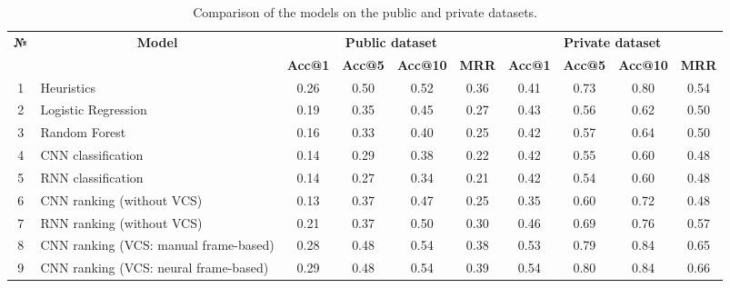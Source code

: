 
\begin{table*}
    \centering
    \caption{Comparison of the models on the public and private datasets.}
    \begin{tabular}{clcccccccc} 
        \toprule
        \multicolumn{1}{c}{\multirow{2}{*}{\textbf{№}}} & \multicolumn{1}{c}{\multirow{2}{*}{\textbf{Model}}} & \multicolumn{4}{c}{\textbf{Public dataset}} & \multicolumn{4}{c}{\textbf{Private dataset}} \\ 
        \cmidrule(lr){3-6}\cmidrule(lr){7-10}
        && \textbf{Acc@1} 
        & \textbf{Acc@5} & \textbf{Acc@10} & \textbf{MRR} & \textbf{Acc@1} 
        & \textbf{Acc@5} & \textbf{Acc@10} & \textbf{MRR} \\ 
        \midrule
        1 &Heuristics & 0.26 
        & 0.50	& 0.52 & 0.36 & 0.41 
        & 0.73 & 0.80 & 0.54 \\ 
        
        2 & Logistic Regression & 0.19 
        & 0.35 & 0.45 & 0.27 & 0.43 
        & 0.56 & 0.62 & 0.50 \\ 
        
        3 & Random Forest & 0.16 
        & 0.33 & 0.40 & 0.25 & 0.42 
        & 0.57 & 0.64 & 0.50 \\ 
        
        4 & CNN classification & 0.14 
        & 0.29 & 0.38 & 0.22	 & 0.42 
        & 0.55 & 0.60 & 0.48 \\ 
        
        5 & RNN classification & 0.14 
        & 0.27	& 0.34 & 0.21	& 0.42  
        & 0.54 & 0.60 & 0.48 \\ 
        
        6 & CNN ranking (without VCS) & 0.13
        & 0.37 &	0.47 & 0.25 & 0.35 
        & 0.60 & 0.72 & 0.48 \\ 
        
        7 & RNN ranking (without VCS) & 0.21 
        & 0.37 &	0.50 & 0.30 & 0.46 
        & 0.69 & 0.76 & 0.57 \\ 
        \midrule
        8 &CNN ranking (VCS: manual frame-based) & 0.28	
        & 0.48 & 0.54 & 0.38 & 0.53 
        & 0.79 & 	0.84 & 0.65 \\ 
        
        9 & CNN ranking (VCS: neural frame-based) & 0.29 
        & 0.48 & 0.54 & 0.39 & 0.54
        & 0.80 & 0.84 & 0.66 \\ 
        

\end{tabular}
\end{table*}
